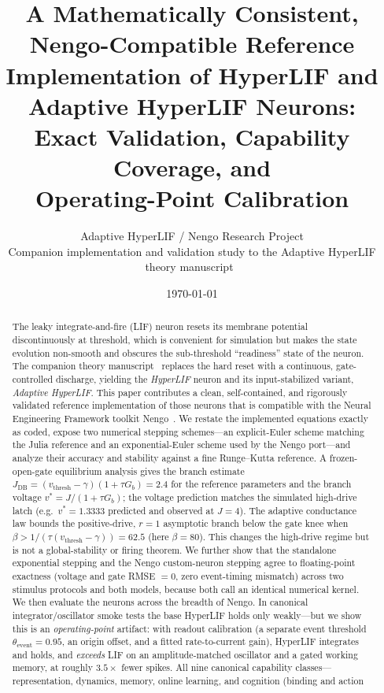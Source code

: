 \documentclass[11pt]{article}
\title{\textbf{A Mathematically Consistent, Nengo-Compatible Reference\\
Implementation of HyperLIF and Adaptive HyperLIF Neurons:\\
Exact Validation, Capability Coverage, and\\
Operating-Point Calibration}}
\author{%
  Adaptive HyperLIF / Nengo Research Project\\
  \small Companion implementation and validation study to the Adaptive HyperLIF theory manuscript~\cite{hyperlif_theory}
}
\date{\today}
\newcommand{\vth}{v_{\mathrm{thresh}}}
\newcommand{\thetaevent}{\theta_{\mathrm{event}}}
\newcommand{\Gb}{G_{b}}
\newcommand{\Jdb}{J_{\mathrm{DB}}}
\begin{document}
\maketitle

\begin{abstract}
The leaky integrate-and-fire (LIF) neuron resets its membrane potential
discontinuously at threshold, which is convenient for simulation but makes the
state evolution non-smooth and obscures the sub-threshold ``readiness'' state of the
neuron. The companion theory manuscript~\cite{hyperlif_theory} replaces the
hard reset with a continuous, gate-controlled discharge, yielding the
\emph{HyperLIF} neuron and its input-stabilized variant, \emph{Adaptive
HyperLIF}. This paper contributes a clean, self-contained, and rigorously
validated reference implementation of those neurons that is compatible with the
Neural Engineering Framework toolkit Nengo~\cite{bekolay2014nengo}. We restate
the implemented equations exactly as coded, expose two numerical stepping
schemes---an explicit-Euler scheme matching the Julia reference and an
exponential-Euler scheme used by the Nengo port---and analyze their accuracy and
stability against a fine Runge--Kutta reference. A frozen-open-gate equilibrium
analysis gives the branch estimate
$\Jdb=(\vth-\gamma)(1+\tau\Gb)=2.4$ for the reference parameters and the branch
voltage $v^\ast=J/(1+\tau\Gb)$; the voltage prediction matches the simulated
high-drive latch (e.g.\ $v^\ast=1.3333$ predicted and observed at $J=4$). The
adaptive conductance law bounds the positive-drive, $r=1$ asymptotic branch below
the gate knee when $\beta>1/(\tau(\vth-\gamma))=62.5$ (here $\beta=80$). This
changes the high-drive regime but is not a global-stability or firing theorem.
We further show that the standalone exponential stepping
and the Nengo custom-neuron stepping agree to floating-point exactness (voltage
and gate RMSE $=0$, zero event-timing mismatch) across two stimulus protocols
and both models, because both call an identical numerical kernel. We then evaluate the neurons across the breadth of Nengo. In canonical
integrator/oscillator smoke tests the base HyperLIF holds only weakly---but we
show this is an \emph{operating-point} artifact: with readout calibration (a
separate event threshold $\thetaevent=0.95$, an origin offset, and a fitted
rate-to-current gain), HyperLIF integrates and holds, and \emph{exceeds} LIF on
an amplitude-matched oscillator and a gated working memory, at roughly
$3.5\times$ fewer spikes. All nine canonical capability classes---representation,
dynamics, memory, online learning, and cognition (binding and action

\end{abstract}
\end{document}

